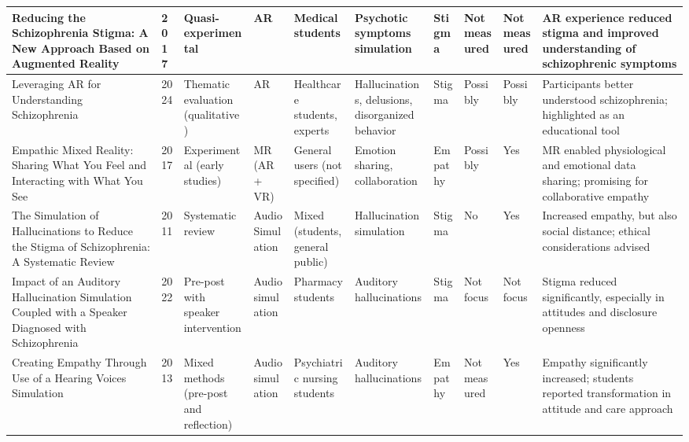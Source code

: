 \begin{landscape}
\begin{longtable}{|P{2.8cm}|P{0.6cm}|P{1.8cm}|P{1.2cm}|P{1.2cm}|P{2cm}|P{1.2cm}|P{1.2cm}|P{1.2cm}|P{3cm}|}
    Reducing the Schizophrenia Stigma: A New Approach Based on Augmented Reality & 2017 & Quasi-experimental & AR & Medical students & Psychotic symptoms simulation & Stigma & Not measured & Not measured & AR experience reduced stigma and improved understanding of schizophrenic symptoms \\
    \hline
    Leveraging AR for Understanding Schizophrenia & 2024 & Thematic evaluation (qualitative) & AR & Healthcare students, experts & Hallucinations, delusions, disorganized behavior & Stigma & Possibly & Possibly & Participants better understood schizophrenia; highlighted as an educational tool \\
    \hline
    Empathic Mixed Reality: Sharing What You Feel and Interacting with What You See & 2017 & Experimental (early studies) & MR (AR + VR) & General users (not specified) & Emotion sharing, collaboration & Empathy & Possibly & Yes & MR enabled physiological and emotional data sharing; promising for collaborative empathy \\
    \hline
    The Simulation of Hallucinations to Reduce the Stigma of Schizophrenia: A Systematic Review & 2011 & Systematic review & Audio Simulation & Mixed (students, general public) & Hallucination simulation & Stigma & No & Yes & Increased empathy, but also social distance; ethical considerations advised \\
    \hline
    Impact of an Auditory Hallucination Simulation Coupled with a Speaker Diagnosed with Schizophrenia & 2022 & Pre-post with speaker intervention & Audio simulation & Pharmacy students & Auditory hallucinations & Stigma & Not focus & Not focus & Stigma reduced significantly, especially in attitudes and disclosure openness \\
    \hline
    Creating Empathy Through Use of a Hearing Voices Simulation & 2013 & Mixed methods (pre-post and reflection) & Audio simulation & Psychiatric nursing students & Auditory hallucinations & Empathy & Not measured & Yes & Empathy significantly increased; students reported transformation in attitude and care approach \\
    \hline


\end{longtable}
\end{landscape}
